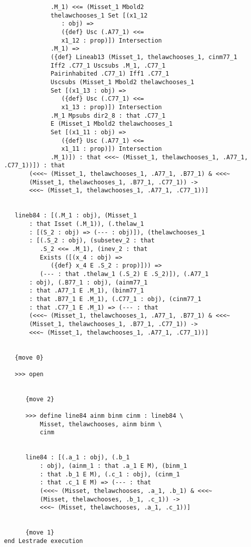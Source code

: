 \documentclass[12pt]{article}
\begin{document}
\begin{verbatim}
             .M_1) <<= (Misset_1 Mbold2 
             thelawchooses_1 Set [(x1_12 
                : obj) => 
                ({def} Usc (.A77_1) <<= 
                x1_12 : prop)]) Intersection 
             .M_1) => 
             ({def} Lineab13 (Misset_1, thelawchooses_1, cinm77_1 
             Iff2 .C77_1 Uscsubs .M_1, .C77_1 
             Pairinhabited .C77_1) Iff1 .C77_1 
             Uscsubs (Misset_1 Mbold2 thelawchooses_1 
             Set [(x1_13 : obj) => 
                ({def} Usc (.C77_1) <<= 
                x1_13 : prop)]) Intersection 
             .M_1 Mpsubs dir2_8 : that .C77_1 
             E (Misset_1 Mbold2 thelawchooses_1 
             Set [(x1_11 : obj) => 
                ({def} Usc (.A77_1) <<= 
                x1_11 : prop)]) Intersection 
             .M_1)]) : that <<<~ (Misset_1, thelawchooses_1, .A77_1, .C77_1))]) : that 
       (<<<~ (Misset_1, thelawchooses_1, .A77_1, .B77_1) & <<<~ 
       (Misset_1, thelawchooses_1, .B77_1, .C77_1)) -> 
       <<<~ (Misset_1, thelawchooses_1, .A77_1, .C77_1))]


   lineb84 : [(.M_1 : obj), (Misset_1 
       : that Isset (.M_1)), (.thelaw_1 
       : [(S_2 : obj) => (--- : obj)]), (thelawchooses_1 
       : [(.S_2 : obj), (subsetev_2 : that 
          .S_2 <<= .M_1), (inev_2 : that 
          Exists ([(x_4 : obj) => 
             ({def} x_4 E .S_2 : prop)])) => 
          (--- : that .thelaw_1 (.S_2) E .S_2)]), (.A77_1 
       : obj), (.B77_1 : obj), (ainm77_1 
       : that .A77_1 E .M_1), (binm77_1 
       : that .B77_1 E .M_1), (.C77_1 : obj), (cinm77_1 
       : that .C77_1 E .M_1) => (--- : that 
       (<<<~ (Misset_1, thelawchooses_1, .A77_1, .B77_1) & <<<~ 
       (Misset_1, thelawchooses_1, .B77_1, .C77_1)) -> 
       <<<~ (Misset_1, thelawchooses_1, .A77_1, .C77_1))]


   {move 0}

   >>> open


      {move 2}

      >>> define line84 ainm binm cinm : lineb84 \
          Misset, thelawchooses, ainm binm \
          cinm


      line84 : [(.a_1 : obj), (.b_1 
          : obj), (ainm_1 : that .a_1 E M), (binm_1 
          : that .b_1 E M), (.c_1 : obj), (cinm_1 
          : that .c_1 E M) => (--- : that 
          (<<<~ (Misset, thelawchooses, .a_1, .b_1) & <<<~ 
          (Misset, thelawchooses, .b_1, .c_1)) -> 
          <<<~ (Misset, thelawchooses, .a_1, .c_1))]


      {move 1}
end Lestrade execution
\end{verbatim}
\end{document}
